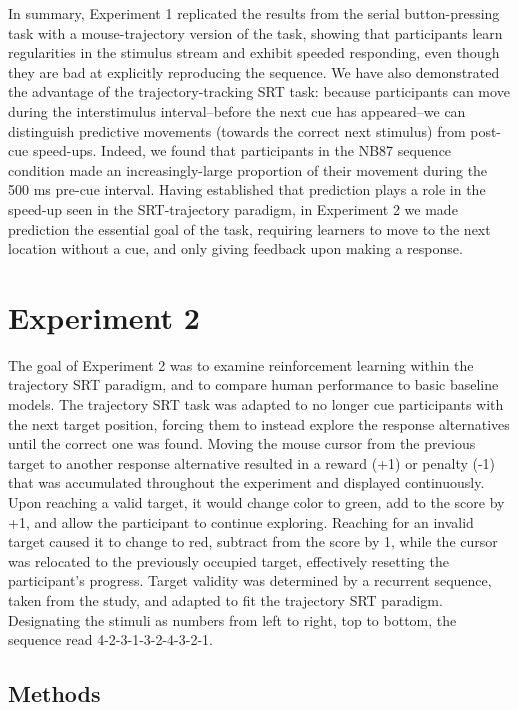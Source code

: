 \documentclass[man,floatsintext]{apa6}
\begin{document}
In summary, Experiment 1 replicated the results from the  serial button-pressing task with a mouse-trajectory version of the task, showing that participants learn regularities in the stimulus stream and exhibit speeded responding, even though they are bad at explicitly reproducing the sequence. We have also demonstrated the advantage of the trajectory-tracking SRT task: because participants can move during the interstimulus interval--before the next cue has appeared--we can distinguish predictive movements (towards the correct next stimulus) from post-cue speed-ups. Indeed, we found that participants in the NB87 sequence condition made an increasingly-large proportion of their movement during the 500 ms pre-cue interval. Having established that prediction plays a role in the speed-up seen in the SRT-trajectory paradigm, in Experiment 2 we made prediction the essential goal of the task, requiring learners to move to the next location without a cue, and only giving feedback upon making a response.

\section{Experiment 2}

The goal of Experiment 2 was to examine reinforcement learning within the trajectory SRT paradigm, and to compare human performance to basic baseline models. The trajectory SRT task was adapted to no longer cue participants with the next target position, forcing them to instead explore the response alternatives until the correct one was found. Moving the mouse cursor from the previous target to another response alternative resulted in a reward (+1) or penalty (-1) that was accumulated throughout the experiment and displayed continuously. Upon reaching a valid target, it would change color to green, add to the score by +1, and allow the participant to continue exploring. Reaching for an invalid target caused it to change to red, subtract from the score by 1, while the cursor was relocated to the previously occupied target, effectively resetting the participant's progress. Target validity was determined by a recurrent sequence, taken from the  study, and adapted to fit the trajectory SRT paradigm. Designating the stimuli as numbers from left to right, top to bottom, the sequence read 4-2-3-1-3-2-4-3-2-1.

\subsection{Methods}
\end{document}
